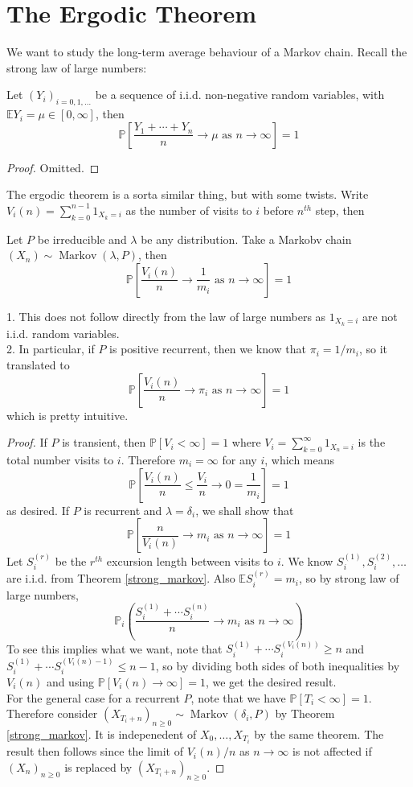 \section{The Ergodic Theorem}
We want to study the long-term average behaviour of a Markov chain.
Recall the strong law of large numbers:
\begin{theorem}
    Let $(Y_i)_{i=0,1,\ldots}$ be a sequence of i.i.d. non-negative random variables, with $\mathbb EY_i=\mu\in[0,\infty]$, then
    $$\mathbb P\left[ \frac{Y_1+\cdots+Y_n}{n}\to\mu\text{ as }n\to\infty \right]=1$$
\end{theorem}
\begin{proof}
    Omitted.
\end{proof}
The ergodic theorem is a sorta similar thing, but with some twists.
Write $V_i(n)=\sum_{k=0}^{n-1}1_{X_k=i}$ as the number of visits to $i$ before $n^{th}$ step, then
\begin{theorem}\label{ergodic}
    Let $P$ be irreducible and $\lambda$ be any distribution.
    Take a Markobv chain $(X_n)\sim\operatorname{Markov}(\lambda,P)$, then
    $$\mathbb P\left[ \frac{V_i(n)}{n}\to\frac{1}{m_i}\text{ as }n\to\infty \right]=1$$
\end{theorem}
\begin{remark}
    1. This does not follow directly from the law of large numbers as $1_{X_k=i}$ are not i.i.d. random variables.\\
    2. In particular, if $P$ is positive recurrent, then we know that $\pi_i=1/m_i$, so it translated to
    $$\mathbb P\left[ \frac{V_i(n)}{n}\to\pi_i\text{ as }n\to\infty \right]=1$$
    which is pretty intuitive.
\end{remark}
\begin{proof}
    If $P$ is transient, then $\mathbb P[V_i<\infty]=1$ where $V_i=\sum_{k=0}^\infty 1_{X_n=i}$ is the total number visits to $i$.
    Therefore $m_i=\infty$ for any $i$, which means
    $$\mathbb P\left[ \frac{V_i(n)}{n}\le\frac{V_i}{n}\to 0=\frac{1}{m_i} \right]=1$$
    as desired.
    If $P$ is recurrent and $\lambda=\delta_i$, we shall show that
    $$\mathbb P\left[ \frac{n}{V_i(n)}\to m_i\text{ as }n\to\infty \right]=1$$
    Let $S_i^{(r)}$ be the $r^{th}$ excursion length between visits to $i$.
    We know $S_i^{(1)},S_i^{(2)},\ldots$ are i.i.d. from Theorem \ref{strong_markov}.
    Also $\mathbb ES_i^{(r)}=m_i$, so by strong law of large numbers,
    $$\mathbb P_i\left( \frac{S_i^{(1)}+\cdots S_i^{(n)}}{n}\to m_i\text{ as }n\to\infty \right)$$
    To see this implies what we want, note that $S_i^{(1)}+\cdots S_i^{(V_i(n))}\ge n$ and $S_i^{(1)}+\cdots S_i^{(V_i(n)-1)}\le n-1$, so by dividing both sides of both inequalities by $V_i(n)$ and using $\mathbb P[V_i(n)\to\infty]=1$, we get the desired result.\\
    For the general case for a recurrent $P$, note that we have $\mathbb P[T_i<\infty]=1$.
    Therefore consider $(X_{T_i+n})_{n\ge 0}\sim\operatorname{Markov}(\delta_i,P)$ by Theorem \ref{strong_markov}.
    It is indepenedent of $X_0,\ldots,X_{T_i}$ by the same theorem.
    The result then follows since the limit of $V_i(n)/n$ as $n\to\infty$ is not affected if $(X_n)_{n\ge 0}$ is replaced by $(X_{T_i+n})_{n\ge 0}$.
\end{proof}
